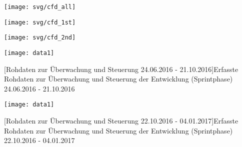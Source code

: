 \label{cfd_all}
\begin{landscape}
	\parbox[c][\textwidth][s]{\linewidth}{%
		\vfill
		\captionsetup{type=figure}\texttt{[image: svg/cfd\_all]}
		
		\vfill	
	}
\end{landscape}





\label{cfd_1st}
\begin{landscape}
	\parbox[c][\textwidth][s]{\linewidth}{%
		\vfill
		\captionsetup{type=figure}\texttt{[image: svg/cfd\_1st]}
		
		\vfill	
	}
\end{landscape}






\label{cfd_2nd}
\begin{landscape}
	\parbox[c][\textwidth][s]{\linewidth}{%
		\vfill
		\captionsetup{type=figure}\texttt{[image: svg/cfd\_2nd]}
		
		\vfill	
	}
\end{landscape}





\label{rohdaten_sprint}
\begin{landscape}
	\parbox[c][\textwidth][s]{\linewidth}{%
		\vfill
		\captionsetup{type=figure}\texttt{[image: data1]}
		
		\vfill	
	}
	[Rohdaten zur Überwachung und Steuerung 24.06.2016 - 21.10.2016]{Erfasste Rohdaten zur Überwachung und Steuerung der Entwicklung (Sprintphase) 24.06.2016 - 21.10.2016}
\end{landscape}

\begin{landscape}
	\parbox[c][\textwidth][s]{\linewidth}{%
		\vfill
		\captionsetup{type=figure}\texttt{[image: data1]}
		
		\vfill	
	}
	[Rohdaten zur Überwachung und Steuerung 22.10.2016 - 04.01.2017]{Erfasste Rohdaten zur Überwachung und Steuerung der Entwicklung (Sprintphase) 22.10.2016 - 04.01.2017}
\end{landscape}

